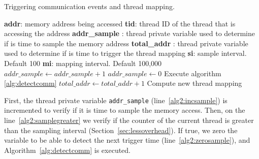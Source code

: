 %
\begin{algorithm}[!ht]
	\caption{Triggering communication events and thread mapping.}\label{alg:commAndMap}
	\small
	\begin{algorithmic}[1]
		\Require
		\Statex \textbf{addr}: memory address being accessed
		\Statex \textbf{tid}: thread ID of the thread that is accessing the address
		\Statex \textbf{addr\_sample} : thread private variable used to determine if is time to sample the memory address
		\Statex \textbf{total\_addr} : thread private variable used to determine if is time to trigger the thread mapping
		\Statex \textbf{si}: sample interval. Default 100
		\Statex \textbf{mi}: mapping interval. Default 100,000
		\Statex
		\State $addr\_sample \gets addr\_sample + 1$ \label{alg2:incsample}
		  \label{alg2:samplegreater}
		\State $addr\_sample \gets 0$ \label{alg2:zerosample}
		\State Execute algorithm \ref{alg:detectcomm}
		\EndIf
		 \label{alg2:isthreadone}
		\State $total\_addr \gets total\_addr + 1$ \label{alg2:inctotaladdr}
		\EndIf
		 \label{alg2:istimetomap}
		 \label{alg2:callequation1}
		\State Compute new thread mapping
		\EndIf
		\EndIf
	\end{algorithmic}
\end{algorithm}
%
First, the thread private variable \texttt{addr\_sample} (line~\ref{alg2:incsample}) is incremented to verify if it is time to sample the memory access. Then, on the line~\ref{alg2:samplegreater} we verify if the counter of the current thread is greater than the sampling interval (Section~\ref{sec:lessoverhead}). If true, we zero the variable to be able to detect the next trigger time (line~\ref{alg2:zerosample}), and Algorithm~\ref{alg:detectcomm} is executed.

